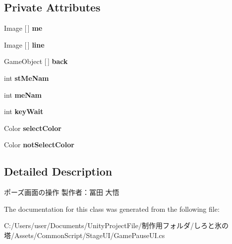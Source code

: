 \subsection*{Private Attributes}
\begin{DoxyCompactItemize}
\item 
\mbox{\label{class_game_pause_u_i_a8173e6275572f0b6b2e61c2076b0272b}} 
Image \mbox{[}$\,$\mbox{]} {\bfseries me}
\item 
\mbox{\label{class_game_pause_u_i_a412ec0681aada769d73e805e8969f900}} 
Image \mbox{[}$\,$\mbox{]} {\bfseries line}
\item 
\mbox{\label{class_game_pause_u_i_a23f9c22b0ad142a67bd36f755d23908f}} 
Game\+Object \mbox{[}$\,$\mbox{]} {\bfseries back}
\item 
\mbox{\label{class_game_pause_u_i_a41c89ed235d2ec2541e3c3a728c16a4d}} 
int {\bfseries st\+Me\+Nam}
\item 
\mbox{\label{class_game_pause_u_i_a9f02a814e4e7a25888862fb1fd71c80a}} 
int {\bfseries me\+Nam}
\item 
\mbox{\label{class_game_pause_u_i_ab8023006bcd3f559a2003c4d16eba20c}} 
int {\bfseries key\+Wait}
\item 
\mbox{\label{class_game_pause_u_i_a9cda373a6f9cfad66f714ccc796fe563}} 
Color {\bfseries select\+Color}
\item 
\mbox{\label{class_game_pause_u_i_a7cf014fde3fc6e9a3b3c08bdef249e1a}} 
Color {\bfseries not\+Select\+Color}
\end{DoxyCompactItemize}


\subsection{Detailed Description}
ポーズ画面の操作 製作者：冨田 大悟 



The documentation for this class was generated from the following file\+:\begin{DoxyCompactItemize}
\item 
C\+:/\+Users/user/\+Documents/\+Unity\+Project\+File/制作用フォルダ/しろと氷の塔/\+Assets/\+Common\+Script/\+Stage\+U\+I/Game\+Pause\+U\+I.\+cs\end{DoxyCompactItemize}
